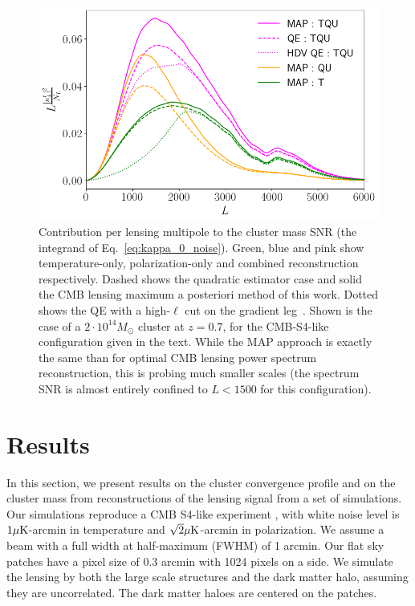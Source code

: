 \documentclass[prd, superscriptaddress, tightenlines, longbibliography, nofootinbib, eqsecnum, amsfonts, amsmath, floatfix, twocolumn, notitlepage]{revtex4-2}
\begin{document}
\begin{figure}
    \centering
    \hspace*{-1.0cm} 
    \includegraphics[width=1.\hsize]{Figures/Integrand.png}
    \caption{Contribution per lensing multipole to the cluster mass SNR (the integrand of Eq.~\ref{eq:kappa_0_noise}). Green, blue and pink show temperature-only, polarization-only and combined reconstruction respectively. Dashed shows the quadratic estimator case and solid the CMB lensing maximum a posteriori method of this work. Dotted shows the QE with a high-$\ell$ cut on the gradient leg~\cite{Hu:2007bt}. Shown is the case of a $2\cdot 10^{14} M_\odot$ cluster at $z = 0.7$, for the CMB-S4-like configuration given in the text. While the MAP approach is exactly the same than for optimal CMB lensing power spectrum reconstruction, this is probing much smaller scales (the spectrum SNR is almost entirely confined to $L < 1500$ for this configuration).}
    \label{fig:int}
\end{figure}

\section{Results}
\label{sec:results}

In this section, we present results on the cluster convergence profile and on the cluster mass from reconstructions of the lensing signal from a set of simulations. 
Our simulations reproduce a CMB S4-like experiment \cite{CMB-S4:2016ple}, with white noise level is  $1 \mu \rm{K}$-arcmin in temperature and $\sqrt{2} \mu \rm{K}$-arcmin in polarization. We assume a beam with a full width at half-maximum (FWHM) of 1 arcmin.
Our flat sky patches have a pixel size of $0.3$ arcmin with 1024 pixels on a side. We simulate the lensing by both the large scale structures and the dark matter halo, assuming they are uncorrelated. The dark matter haloes are centered on the patches. 
\end{document}
